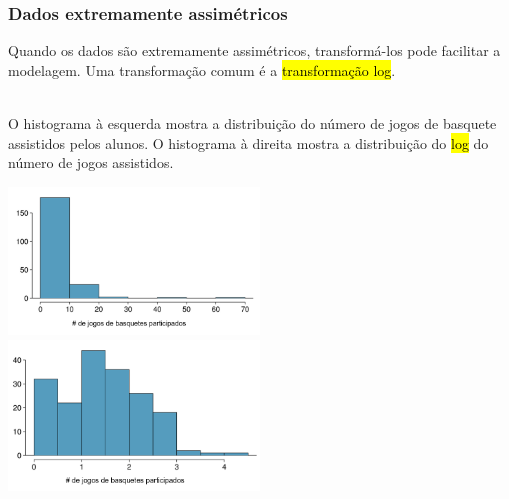 \begin{frame}
\frametitle{Dados extremamente assimétricos}
\justifying
Quando os dados são extremamente assimétricos, transformá-los pode facilitar a modelagem. Uma transformação comum é a \hl{transformação log}.

$\:$ \\
\pause
\justifying
O histograma à esquerda mostra a distribuição do número de jogos de basquete assistidos pelos alunos. O histograma à direita mostra a distribuição do \hl{log} do número de jogos assistidos.

\begin{center}
\includegraphics[width=0.5\textwidth]{1-6_numerical_data/basket_games_hist.png}
\includegraphics[width=0.5\textwidth]{1-6_numerical_data/basket_games_hist_log.png}
\end{center}

\end{frame}


